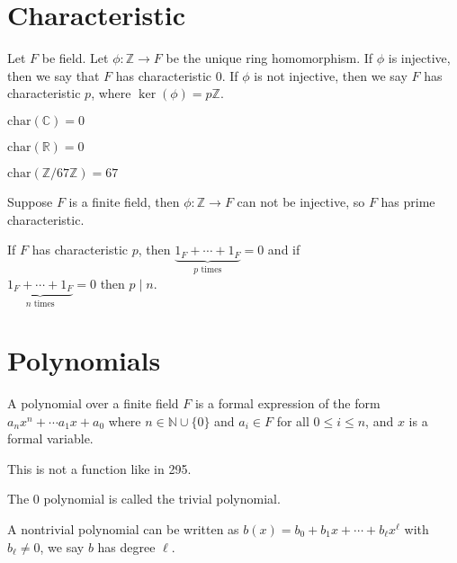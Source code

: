 \section{Characteristic}
\begin{definition}
    Let \(F\) be  field. Let \(\phi \colon \mathbb{Z} \to F\) be the unique ring homomorphism. If \(\phi \) is injective, then we say that \(F\) has characteristic \(0\). If \(\phi \) is not injective, then we say \(F\) has characteristic \(p\), where \(\ker(\phi ) = p\mathbb{Z} \).       
\end{definition}

\begin{eg}
    \(\text{char}(\mathbb{C} ) = 0\) 
\end{eg}
\begin{eg}
    \(\text{char}(\mathbb{R} ) = 0\) 
\end{eg}
\begin{eg}
    \(\text{char}(\mathbb{Z} / 67\mathbb{Z}  ) = 67\) 
\end{eg}

\begin{lemma}
    Suppose \(F\) is a finite field, then \(\phi \colon \mathbb{Z} \to F\) can not be injective, so \(F\) has prime characteristic.  
\end{lemma}

\begin{lemma}
    If \(F\) has characteristic \(p\), then \(\underbrace{1_F + \cdots + 1_F}_{p \text{ times} } = 0\) and if \\ \(\underbrace{1_F + \cdots + 1_F}_{n \text{ times} } = 0\) then \(p\mid n\).
\end{lemma}

\section{Polynomials}
\begin{definition}
    A polynomial over a finite field \(F\) is a formal expression of the form \(a_n x^n + \cdots a_1 x + a_0\) where \(n \in \mathbb{N} \cup \{ 0 \} \) and \(a_i \in F\) for all \(0 \leq i \leq n\), and \(x \) is a formal variable.     
\end{definition}
\begin{note}
    This is not a function like in 295.
\end{note}
\begin{definition}
    The 0 polynomial is called the trivial polynomial.
\end{definition}
\begin{definition}
    A nontrivial polynomial can be written as \(b(x) = b_0 + b_1 x + \cdots +  b_{\ell }  x^{\ell } \) with \(b_{\ell} \neq 0 \), we say \(b\) has degree \(\ell \).   
\end{definition}
